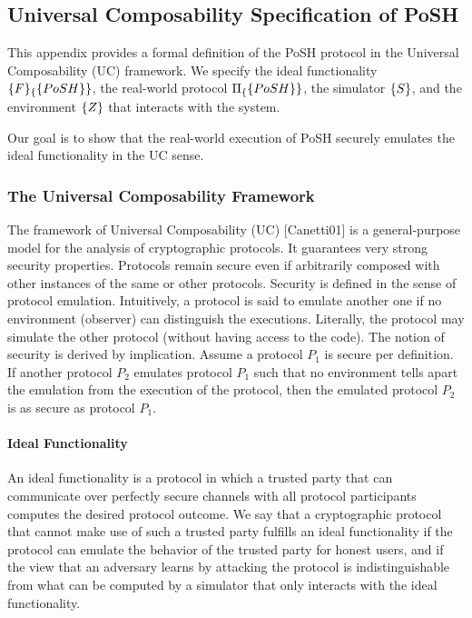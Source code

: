 \documentclass{article}
\begin{document}
\subsection{Universal Composability Specification of PoSH}

This appendix provides a formal definition of the PoSH protocol in the Universal
Composability (UC) framework. We specify the ideal functionality
$\mathcal\{F\}_\{\textsf\{PoSH\}\}$, the real-world protocol $\Pi_\{\textsf\{PoSH\}\}$,
the simulator $\mathcal\{S\}$, and the environment $\mathcal\{Z\}$ that interacts
with the system.

Our goal is to show that the real-world execution of PoSH securely emulates the
ideal functionality in the UC sense.

\subsubsection{The Universal Composability Framework}

The framework of Universal Composability (UC) [Canetti01] is a general-purpose model for the
analysis of cryptographic protocols. It guarantees very strong security
properties. Protocols remain secure even if arbitrarily composed with other
instances of the same or other protocols. Security is defined in the sense of
protocol emulation. Intuitively, a protocol is said to emulate another one if no
environment (observer) can distinguish the executions. Literally, the protocol
may simulate the other protocol (without having access to the code). The notion
of security is derived by implication. Assume a protocol $P_1$ is secure per
definition. If another protocol $P_2$ emulates protocol $P_1$ such that no
environment tells apart the emulation from the execution of the protocol, then
the emulated protocol $P_2$ is as secure as protocol $P_1$.

\paragraph{Ideal Functionality}

An ideal functionality is a protocol in which a trusted party that can
communicate over perfectly secure channels with all protocol participants
computes the desired protocol outcome. We say that a cryptographic protocol that
cannot make use of such a trusted party fulfills an ideal functionality if the
protocol can emulate the behavior of the trusted party for honest users, and if
the view that an adversary learns by attacking the protocol is indistinguishable
from what can be computed by a simulator that only interacts with the ideal
functionality.
\end{document}

